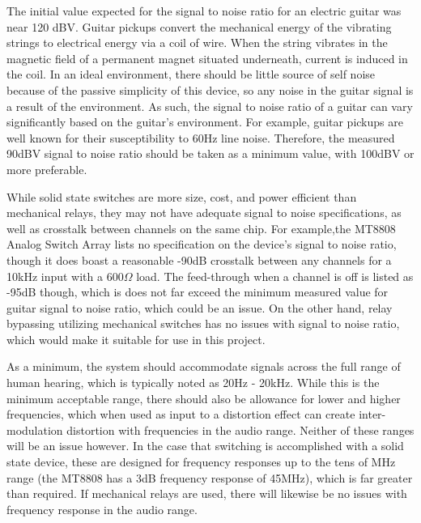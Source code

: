 \documentclass{article}
\begin{document}
		
		The initial value expected for the signal to noise ratio for an electric guitar was near 120 dBV.  Guitar pickups convert the mechanical energy of the vibrating strings to electrical energy via a coil of wire.  When the string vibrates in the magnetic field of a permanent magnet situated underneath, current is induced in the coil.  In an ideal environment, there should be little source of self noise because of the passive simplicity of this device, so any noise in the guitar signal is a result of the environment.  As such, the signal to noise ratio of a guitar can vary significantly based on the guitar's environment.  For example, guitar pickups are well known for their susceptibility to 60Hz line noise.  Therefore, the measured 90dBV signal to noise ratio should be taken as a minimum value, with 100dBV or more preferable.

		While solid state switches are more size, cost, and power efficient than mechanical relays, they may not have adequate signal to noise specifications, as well as crosstalk between channels on the same chip.  For example,the MT8808 Analog Switch Array \cite{Zarlink:MT8808} lists no specification on the device's signal to noise ratio, though it does boast a reasonable -90dB crosstalk between any channels for a 10kHz input with a $600 \Omega$ load.  The feed-through when a channel is off is listed as -95dB though, which is does not far exceed the minimum measured value for guitar signal to noise ratio, which could be an issue.  On the other hand, relay bypassing utilizing mechanical switches has no issues with signal to noise ratio, which would make it suitable for use in this project.

		As a minimum, the system should accommodate signals across the full range of human hearing, which is typically noted as 20Hz - 20kHz.  While this is the minimum acceptable range, there should also be allowance for lower and higher frequencies, which when used as input to a distortion effect can create inter-modulation distortion with frequencies in the audio range.  Neither of these ranges will be an issue however.  In the case that switching is accomplished with a solid state device, these are designed for frequency responses up to the tens of MHz range (the MT8808 has a 3dB frequency response of 45MHz), which is far greater than required.  If mechanical relays are used, there will likewise be no issues with frequency response in the audio range.
		
		
\end{document}
